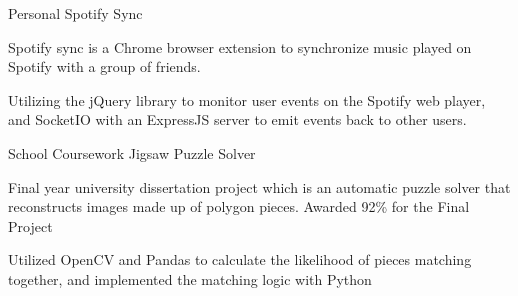 

\begin{cventries}

\cventry
    {Personal}
    {Spotify Sync}
    {}
    {}
    {
     \begin{cvitems} %
        \item {Spotify sync is a Chrome browser extension to synchronize music played on Spotify with a group of friends.}
        \item {Utilizing the jQuery library to monitor user events on the Spotify web player, and SocketIO with an ExpressJS server to emit events back to other users.}
      \end{cvitems}
    }
    
\cventry
    {School Coursework} %
    {Jigsaw Puzzle Solver} %
    {} %
    {} %
    {
     \begin{cvitems} %
        \item {Final year university dissertation project which is an automatic puzzle solver that reconstructs images made up of polygon pieces. Awarded 92\% for the Final Project}
        \item {Utilized OpenCV and Pandas to calculate the likelihood of pieces matching together, and implemented the matching logic with Python}
      \end{cvitems}
    }
    


\end{cventries}
